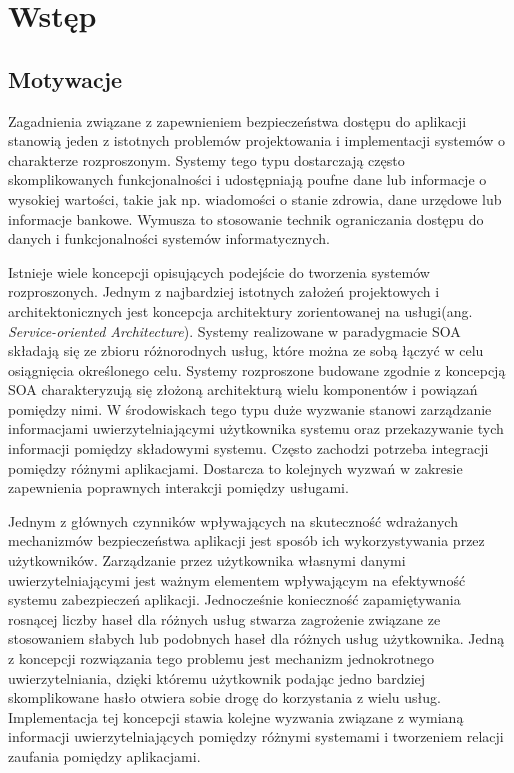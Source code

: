 \chapter{Wstęp}
\label{cha:wstep}


\section{Motywacje}
\label{sec:motywacje}

Zagadnienia związane z zapewnieniem bezpieczeństwa dostępu do aplikacji stanowią jeden z istotnych problemów projektowania i implementacji systemów o charakterze rozproszonym. Systemy tego typu dostarczają często skomplikowanych funkcjonalności i udostępniają poufne dane lub informacje o wysokiej wartości, takie jak np. wiadomości o stanie zdrowia, dane urzędowe lub informacje bankowe. Wymusza to stosowanie technik ograniczania dostępu do danych i funkcjonalności systemów informatycznych.

Istnieje wiele koncepcji opisujących podejście do tworzenia systemów rozproszonych. Jednym z najbardziej istotnych założeń projektowych i architektonicznych jest koncepcja architektury zorientowanej na usługi(ang. \textit{Service-oriented Architecture}). Systemy realizowane w paradygmacie SOA składają się ze zbioru różnorodnych usług, które można ze sobą łączyć w celu osiągnięcia określonego celu. Systemy rozproszone budowane zgodnie z koncepcją SOA charakteryzują się złożoną architekturą wielu komponentów i powiązań pomiędzy nimi. W środowiskach tego typu duże wyzwanie stanowi zarządzanie informacjami uwierzytelniającymi użytkownika systemu oraz przekazywanie tych informacji pomiędzy składowymi systemu. Często zachodzi potrzeba integracji pomiędzy różnymi aplikacjami. Dostarcza to kolejnych wyzwań w zakresie zapewnienia poprawnych interakcji pomiędzy usługami.

Jednym z głównych czynników wpływających na skuteczność wdrażanych mechanizmów bezpieczeństwa aplikacji jest sposób ich wykorzystywania przez użytkowników. Zarządzanie przez użytkownika własnymi danymi uwierzytelniającymi jest ważnym elementem wpływającym na efektywność systemu zabezpieczeń aplikacji. Jednocześnie konieczność zapamiętywania rosnącej liczby haseł dla różnych usług stwarza zagrożenie związane ze stosowaniem słabych lub podobnych haseł dla różnych usług użytkownika. Jedną z koncepcji rozwiązania tego problemu jest mechanizm jednokrotnego uwierzytelniania, dzięki któremu użytkownik podając jedno bardziej skomplikowane hasło otwiera sobie drogę do korzystania z wielu usług. Implementacja tej koncepcji stawia kolejne wyzwania związane z wymianą informacji uwierzytelniających pomiędzy różnymi systemami i tworzeniem relacji zaufania pomiędzy  aplikacjami.

